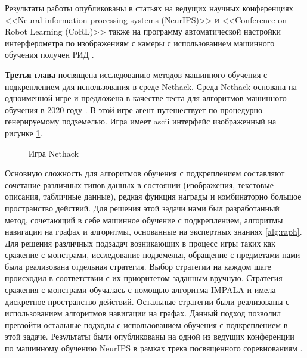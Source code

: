 Результаты работы опубликованы в статьях \cite{confbib1, confbib2} на ведущих научных конференциях <<Neural information processing systems (NeurIPS)>> и <<Conference on Robot Learning (CoRL)>> также на программу автоматической настройки интерферометра по изображениям с камеры с использованием машинного обучения получен РИД \cite{progbib1}.

\underline{\textbf{Третья глава}} посвящена исследованию методов машинного обучения с подкреплением для использования в среде Nethack. Среда Nethack основана на одноименной игре и предложена в качестве теста для алгоритмов машинного обучения в 2020 году \cite{nethack}. В этой игре агент путешествует по процедурно генерируемому подземелью. Игра имеет ascii интерфейс изображенный на рисунке \ref{fig:nethack}.

\begin{figure}[ht]
    \caption{Игра Nethack}\label{fig:nethack}
\end{figure}

Основную сложность для алгоритмов обучения с подкреплением составляют сочетание различных типов данных в состоянии (изображения, текстовые описания, табличные данные), редкая функция награды и комбинаторно большое пространство действий. Для решения этой задачи нами был разработанный метод, сочетающий в себе машинное обучение с подкреплением, алгоритмы навигации на графах и алгоритмы, основанные на экспертных знаниях \ref{alg:raph}. Для решения различных подзадач возникающих в процесс игры таких как сражение с монстрами, исследование подземелья, обращение с предметами нами была реализована отдельная стратегия. Выбор стратегии на каждом шаге происходил в соответствии с их приоритетом заданным вручную. Стратегия сражения с монстрами обучалась с помощью алгоритма IMPALA \cite{impala} и имела дискретное пространство действий. Остальные стратегии были реализованы с использованием алгоритмов навигации на графах. Данный подход позволил превзойти остальные подходы с использованием обучения с подкреплением в этой задаче. Результаты были опубликованы на одной из ведущих конференции по машинному обучению NeurIPS в рамках трека посвященного соревнованиям \autocite{confbib3}.


